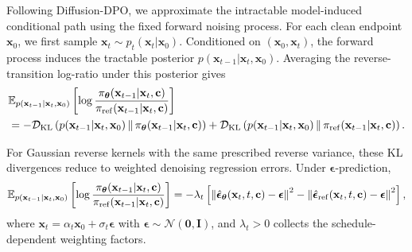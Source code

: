 Following Diffusion-DPO, we approximate the intractable model-induced
conditional path using the fixed forward noising process. For each clean
endpoint $\mathbf x_0$, we first sample $\mathbf x_t
\sim
p_t(\mathbf x_t|\mathbf x_0)$.
Conditioned on $(\mathbf x_0,\mathbf x_t)$, the forward process induces the
tractable posterior $p(\mathbf x_{t-1}|\mathbf x_t,\mathbf x_0)$.
Averaging the reverse-transition log-ratio under this posterior gives
\begin{align*}
&\mathbb{E}_{p(\mathbf x_{t-1}|\mathbf x_t,\mathbf x_0)}
\left[
\log
\frac{
\pi_{\bm\theta}(\mathbf x_{t-1}|\mathbf x_t,\mathbf c)
}{
\pi_{\mathrm{ref}}(\mathbf x_{t-1}|\mathbf x_t,\mathbf c)
}
\right]
\nonumber\\&=
-
\mathcal D_{\mathrm{KL}}
\left(
p(\mathbf x_{t-1}|\mathbf x_t,\mathbf x_0)
\,\middle\|\,
\pi_{\bm\theta}(\mathbf x_{t-1}|\mathbf x_t,\mathbf c)
\right)+
\mathcal D_{\mathrm{KL}}
\left(
p(\mathbf x_{t-1}|\mathbf x_t,\mathbf x_0)
\,\middle\|\,
\pi_{\mathrm{ref}}(\mathbf x_{t-1}|\mathbf x_t,\mathbf c)
\right).
\end{align*}

For Gaussian reverse kernels with the same prescribed reverse variance, these
KL divergences reduce to weighted denoising regression errors. Under
$\boldsymbol\epsilon$-prediction,
\begin{align}
\mathbb{E}_{p(\mathbf x_{t-1}|\mathbf x_t,\mathbf x_0)}
\left[
\log
\frac{
\pi_{\bm\theta}(\mathbf x_{t-1}|\mathbf x_t,\mathbf c)
}{
\pi_{\mathrm{ref}}(\mathbf x_{t-1}|\mathbf x_t,\mathbf c)
}
\right]
=
-\lambda_t
\left[
\left\|
\hat{\boldsymbol\epsilon}_{\bm\theta}(\mathbf x_t,t,\mathbf c)
-\boldsymbol\epsilon
\right\|^2
-
\left\|
\hat{\boldsymbol\epsilon}_{\mathrm{ref}}(\mathbf x_t,t,\mathbf c)
-\boldsymbol\epsilon
\right\|^2
\right],
\end{align}
where $\mathbf x_t
=
\alpha_t\mathbf x_0
+
\sigma_t\boldsymbol\epsilon$ with $\boldsymbol\epsilon\sim\mathcal N(\mathbf 0,\mathbf I)$, and $\lambda_t>0$ collects the schedule-dependent weighting factors.

